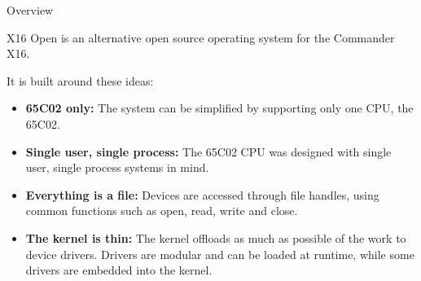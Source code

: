 \begin{chapterpage}{Overview}
\end{chapterpage}


X16 Open is an alternative open source operating system for the Commander X16.

It is built around these ideas:

\begin{itemize}
    \item \textbf{65C02 only: } The system can be simplified by supporting only one CPU, the 65C02.
    \item \textbf{Single user, single process: } The 65C02 CPU was designed with single user, single process systems in mind.
    \item \textbf{Everything is a file: } Devices are accessed through file handles, using common functions such as open, read, write and close.
    \item \textbf{The kernel is thin: } The kernel offloads as much as possible of the work to device drivers. 
    Drivers are modular and can be loaded at runtime, while some drivers are embedded into the kernel.
\end{itemize}


